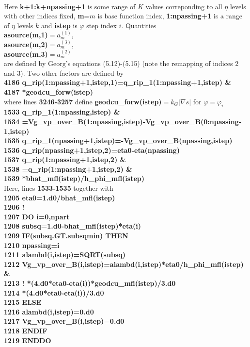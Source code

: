 \documentclass[preprint,prb,aps]{revtex4-1}
\begin{document}
\\
Here {\bf k+1:k+npassing+1} is some range of $K$ values correponding to all $\eta$ levels with other indices fixed,
{\bf m}=$m$ is base function index, {\bf 1:npassing+1} is a range of $\eta$ levels $k$ and {\bf istep} is $\varphi$
step index $i$. Quantities
\\
{\bf asource(m,1)}$=a_m^{(1)}$, \\
{\bf asource(m,2)}$=a_m^{(3)}$, \\
{\bf asource(m,3)}$=a_m^{(2)}$ \\
are defined by Georg's equations (5.12)-(5.15) (note the remapping of indices 2 and 3).
Two other factors are defined by
\\
{\bf
4186       q\_rip(1:npassing+1,istep,1)=q\_rip\_1(1:npassing+1,istep)           \& \\
4187                                   *geodcu\_forw(istep)
}
\\
where lines {\bf 3246-3257} define {\bf geodcu\_forw(istep)}$=k_G |\nabla s|$ for $\varphi=\varphi_i$
\\
{\bf
1533     q\_rip\_1(1:npassing,istep)                                    \& \\
1534           =Vg\_vp\_over\_B(1:npassing,istep)-Vg\_vp\_over\_B(0:npassing-1,istep) \\
1535     q\_rip\_1(npassing+1,istep)=-Vg\_vp\_over\_B(npassing,istep) \\
1536     q\_rip(npassing+1,istep,2)=eta0-eta(npassing) \\
1537     q\_rip(1:npassing+1,istep,2)                                  \& \\
1538           =q\_rip(1:npassing+1,istep,2)                           \& \\
1539           *bhat\_mfl(istep)/h\_phi\_mfl(istep)
}
\\
Here, lines {\bf 1533-1535} together with \\
{\bf
1205     eta0=1.d0/bhat\_mfl(istep) \\
1206 ! \\
1207     DO i=0,npart \\
1208       subsq=1.d0-bhat\_mfl(istep)*eta(i) \\
1209       IF(subsq.GT.subsqmin) THEN \\
1210         npassing=i \\
1211         alambd(i,istep)=SQRT(subsq) \\
1212         Vg\_vp\_over\_B(i,istep)=alambd(i,istep)*eta0/h\_phi\_mfl(istep)            \& \\
1213 !                             *(4.d0*eta0-eta(i))*geodcu\_mfl(istep)/3.d0 \\
1214                              *(4.d0*eta0-eta(i))/3.d0 \\
1215       ELSE \\
1216         alambd(i,istep)=0.d0 \\
1217         Vg\_vp\_over\_B(i,istep)=0.d0 \\
1218       ENDIF \\
1219     ENDDO
}
\end{document}
